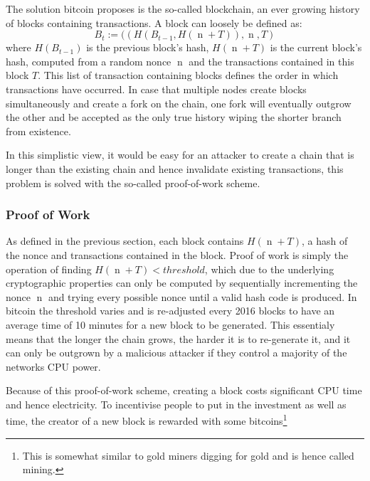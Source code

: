 \documentclass[12pt,msc,a4paper,oneside]{ucl_thesis}
\DeclareMathOperator{\nonce}{n}
\begin{document}
The solution bitcoin proposes is the so-called blockchain, an ever growing history of blocks containing transactions. A block can loosely be defined as:
\begin{equation}
    B_t := ((H(B_{t-1}, H(\nonce + T)), \nonce, T)
\end{equation}
where $H(B_{t-1})$ is the previous block's hash, $H(\nonce + T)$ is the current block's hash, computed from a random nonce $\nonce$ and the transactions contained in this block $T$. This list of transaction containing blocks defines the order in which transactions have occurred. In case that multiple nodes create blocks simultaneously and create a fork on the chain, one fork will eventually outgrow the other and be accepted as the only true history wiping the shorter branch from existence.

In this simplistic view, it would be easy for an attacker to create a chain that is longer than the existing chain and hence invalidate existing transactions, this problem is solved with the so-called proof-of-work scheme.

\subsubsection{Proof of Work} \label{sec:background_bitcoin:proof_of_work}
As defined in the previous section, each block contains $H(\nonce + T)$, a hash of the nonce and transactions contained in the block. Proof of work is simply the operation of finding $H(\nonce + T) < threshold$, which due to the underlying cryptographic properties can only be computed by sequentially incrementing the nonce $\nonce$ and trying every possible nonce until a valid hash code is produced. In bitcoin the threshold varies and is re-adjusted every 2016 blocks to have an average time of 10 minutes for a new block to be generated. This essentialy means that the longer the chain grows, the harder it is to re-generate it, and it can only be outgrown by a malicious attacker if they control a majority of the networks CPU power.

Because of this proof-of-work scheme, creating a block costs significant CPU time and hence electricity. To incentivise people to put in the investment as well as time, the creator of a new block is rewarded with some bitcoins\footnote{This is somewhat similar to gold miners digging for gold and is hence called mining.} \cite{bitcoin:satoshi}
\end{document}
